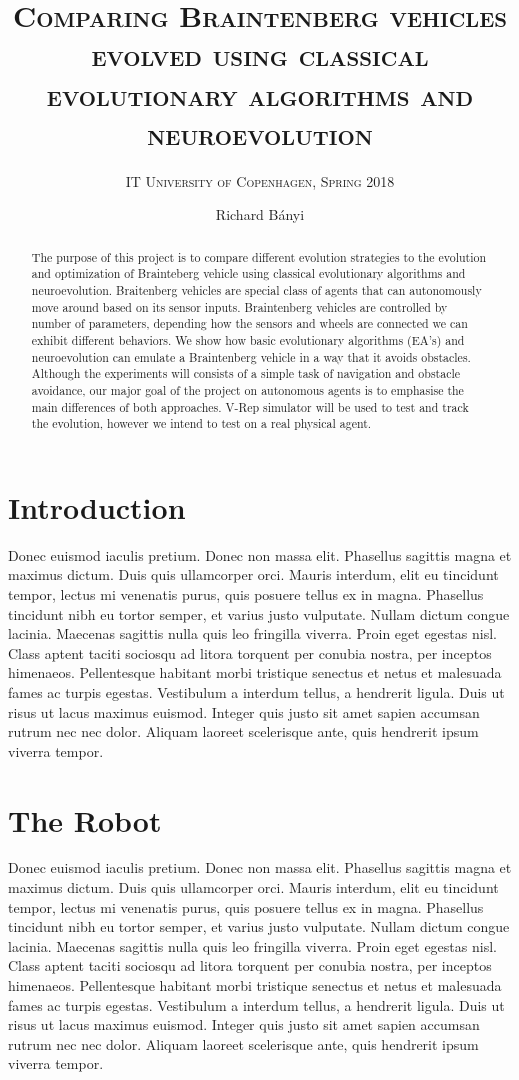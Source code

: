 \documentclass[format=acmsmall, review=false, screen=true]{acmart}
\author{Richard Bányi}
\title{\textsc{Comparing Braintenberg vehicles evolved using classical evolutionary algorithms and neuroevolution}}
\subtitle{\textsc{IT University of Copenhagen, Spring 2018}}
\begin{document}
\begin{abstract}
The purpose of this project is to compare different evolution strategies to the evolution and optimization of  Brainteberg vehicle  using classical evolutionary algorithms and neuroevolution. Braitenberg vehicles are special class of agents that can autonomously move around based on its sensor inputs. Braintenberg vehicles are controlled by number of parameters, depending how the sensors and wheels are connected we can exhibit different behaviors. We show how basic evolutionary algorithms (EA’s) and neuroevolution can emulate a Braintenberg vehicle in a way that it avoids obstacles. Although the experiments will consists of a simple task of navigation and obstacle avoidance, our major goal of the project on autonomous agents is to emphasise the main differences  of both approaches. V-Rep simulator will be used to test and track the evolution, however we intend to test on a real physical agent.
	\end{abstract}
\maketitle


\section{Introduction}

Donec euismod iaculis pretium. Donec non massa elit. Phasellus sagittis magna et maximus dictum. Duis quis ullamcorper orci. Mauris interdum, elit eu tincidunt tempor, lectus mi venenatis purus, quis posuere tellus ex in magna. Phasellus tincidunt nibh eu tortor semper, et varius justo vulputate. Nullam dictum congue lacinia. Maecenas sagittis nulla quis leo fringilla viverra. Proin eget egestas nisl. Class aptent taciti sociosqu ad litora torquent per conubia nostra, per inceptos himenaeos. Pellentesque habitant morbi tristique senectus et netus et malesuada fames ac turpis egestas. Vestibulum a interdum tellus, a hendrerit ligula. Duis ut risus ut lacus maximus euismod. Integer quis justo sit amet sapien accumsan rutrum nec nec dolor. Aliquam laoreet scelerisque ante, quis hendrerit ipsum viverra tempor.

\section{The Robot}

Donec euismod iaculis pretium. Donec non massa elit. Phasellus sagittis magna et maximus dictum. Duis quis ullamcorper orci. Mauris interdum, elit eu tincidunt tempor, lectus mi venenatis purus, quis posuere tellus ex in magna. Phasellus tincidunt nibh eu tortor semper, et varius justo vulputate. Nullam dictum congue lacinia. Maecenas sagittis nulla quis leo fringilla viverra. Proin eget egestas nisl. Class aptent taciti sociosqu ad litora torquent per conubia nostra, per inceptos himenaeos. Pellentesque habitant morbi tristique senectus et netus et malesuada fames ac turpis egestas. Vestibulum a interdum tellus, a hendrerit ligula. Duis ut risus ut lacus maximus euismod. Integer quis justo sit amet sapien accumsan rutrum nec nec dolor. Aliquam laoreet scelerisque ante, quis hendrerit ipsum viverra tempor.
 
\end{document}
